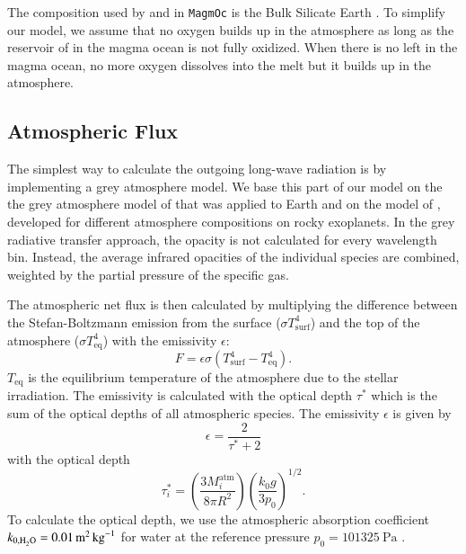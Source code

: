 \documentclass[paper=letterpaper,fontsize=12pt,oneside,twocolumn]{article}
\newcommand{\magmoc}{\texttt{\footnotesize{MagmOc}}}
\begin{document}
The composition used by \citet{Schaefer2016} and in \magmoc{} is the Bulk Silicate Earth \citep{ONeill1998}.
To simplify our model, we assume that no oxygen builds up in the atmosphere as long as the reservoir of  in the magma ocean is not fully oxidized.
When there is no  left in the magma ocean, no more oxygen dissolves into the melt but it builds up in the atmosphere.

\subsection{Atmospheric Flux}
\label{Sec_Flux}
The simplest way to calculate the outgoing long-wave radiation is by implementing a grey atmosphere model. We base this part of our model on the the grey atmosphere model of \citet{Elkins-Tanton2008} that was applied to Earth and on the model of \citet{Carone2014}, developed for different atmosphere compositions on rocky exoplanets. In the grey radiative transfer approach, the opacity is not calculated for every wavelength bin. Instead, the average infrared opacities of the individual species are combined, weighted by the partial pressure of the specific gas.

The atmospheric net flux is then calculated by multiplying the difference between the Stefan-Boltzmann emission from the surface ($\sigma T_\mathrm{surf}^4$) and the top of the atmosphere ($\sigma T_\mathrm{eq}^4$) with the emissivity \nolinebreak $\epsilon$:
\begin{equation}
\label{Eq_fluxgrey}
F = \epsilon \sigma ( T_\mathrm{surf}^4 - T_\mathrm{eq}^4 ).
\end{equation}
$T_\mathrm{eq}$ is the equilibrium temperature of the atmosphere due to the stellar irradiation.
The emissivity is calculated with the optical depth $\tau^*$ which is the sum of the optical depths of all atmospheric species.
The emissivity $\epsilon$ is given by
\begin{equation}
\epsilon = \frac{2}{\tau^* + 2}
\end{equation}
with the optical depth
\begin{equation}
\tau^*_i = \left( \frac{3 M_{i}^\mathrm{atm}}{8 \pi R^2} \right) \left( \frac{k_0 g}{3 p_0} \right)^{1/2}.
\end{equation}
To  calculate the optical depth, we use the atmospheric absorption coefficient $k_{0,\ce{H2O}} = \SI{0.01}{\metre\squared\per\kilogram}$ for water \citep{Elkins-Tanton2008} at the reference pressure $p_0 = \SI{101325}{\pascal}$ \citep{Yamamoto1952}.
\end{document}
